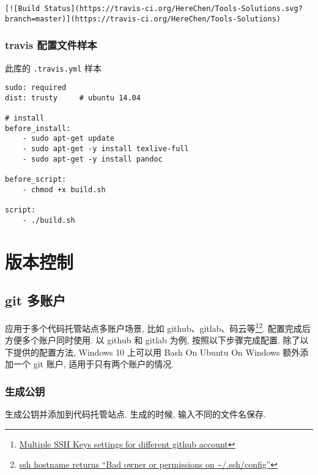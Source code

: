 \begin{lstlisting}
[![Build Status](https://travis-ci.org/HereChen/Tools-Solutions.svg?branch=master)](https://travis-ci.org/HereChen/Tools-Solutions)
\end{lstlisting}

\subsubsection{travis
配置文件样本}\label{travis-ux914dux7f6eux6587ux4ef6ux6837ux672c}

此库的 \lstinline!.travis.yml! 样本

\begin{lstlisting}
sudo: required
dist: trusty     # ubuntu 14.04

# install
before_install:
    - sudo apt-get update
    - sudo apt-get -y install texlive-full
    - sudo apt-get -y install pandoc

before_script:
    - chmod +x build.sh

script:
    - ./build.sh
\end{lstlisting}

\section{版本控制}\label{ux7248ux672cux63a7ux5236}

\subsection{git 多账户}\label{git-ux591aux8d26ux6237}

应用于多个代码托管站点多账户场景, 比如 github、gitlab、码云等\footnote{\href{https://gist.github.com/jexchan/2351996}{Multiple
  SSH Keys settings for different github account}}\footnote{\href{https://serverfault.com/questions/253313/ssh-hostname-returns-bad-owner-or-permissions-on-ssh-config}{ssh
  hostname returns ``Bad owner or permissions on
  \textasciitilde{}/.ssh/config''}}. 配置完成后方便多个账户同时使用. 以
github 和 gitlab 为例, 按照以下步骤完成配置. 除了以下提供的配置方法,
Windows 10 上可以用 Bash On Ubuntu On Windows 额外添加一个 git 账户,
适用于只有两个账户的情况.

\subsubsection{生成公钥}\label{ux751fux6210ux516cux94a5}

生成公钥并添加到代码托管站点. 生成的时候, 输入不同的文件名保存.


